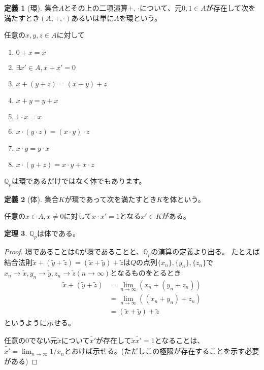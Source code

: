 \documentclass[uplatex]{jsarticle}
\newcommand{\Q}{\mathbb{Q}}
\theoremstyle{definition} %
\newtheorem{thm}{定理}
\newtheorem{defi}[thm]{定義}
\begin{document}
\begin{oframed}\begin{defi}[環]
集合$A$とその上の二項演算$+$, $\cdot$について、元$0, 1 \in A$が存在して次を満たすとき$(A, +, \cdot)$あるいは単に$A$を環という。

任意の$x, y, z \in A$に対して
\begin{enumerate}
\item $0 + x = x$
\item $\exists x'\in A, x + x' = 0$
\item $x + (y + z) = (x + y) + z$
\item $x + y = y + x$
\item $1 \cdot x = x$
\item $x \cdot (y \cdot z) = (x \cdot y) \cdot z$
\item $x \cdot y = y \cdot x$
\item $x \cdot (y + z) = x \cdot y + x \cdot z$
\end{enumerate}
\end{defi}\end{oframed}

$\Q_p$は環であるだけではなく体でもあります。

\begin{oframed}\begin{defi}[体]
集合$K$が環であって次を満たすとき$K$を体という。

任意の$x \in A, x \ne 0$に対して$x \cdot x' = 1$となる$x' \in K$がある。
\end{defi}\end{oframed}

\begin{oframed}\begin{thm}
$\Q_p$は体である。
\end{thm}\end{oframed}
\begin{proof}
環であることは$\Q$が環であることと、$\Q_p$の演算の定義より出る。
たとえば結合法則$\tilde{x} + (\tilde{y} + \tilde{z}) = (\tilde{x} + \tilde{y}) + \tilde{z}$は$Q$の点列$\{x_n\}, \{y_n\}, \{z_n\}$で$x_n \to \tilde{x}, y_n \to \tilde{y}, z_n \to \tilde{z} (n \to \infty)$となるものをとるとき
\begin{align*}
\tilde{x} + (\tilde{y} + \tilde{z}) &= \lim_{n\to\infty} (x_n + (y_n + z_n)) \\
 &= \lim_{n\to\infty} ((x_n + y_n) + z_n) \\
 &= (\tilde{x} + \tilde{y}) + \tilde{z}
\end{align*}
というように示せる。

任意の$0$でない元$\tilde{x}$について$\tilde{x'}$が存在して$\tilde{x} \tilde{x'} = 1$となることは、$\tilde{x'} = \lim_{n\to\infty}{1/x_n}$とおけば示せる。(ただしこの極限が存在することを示す必要がある)
\end{proof}
\end{document}
